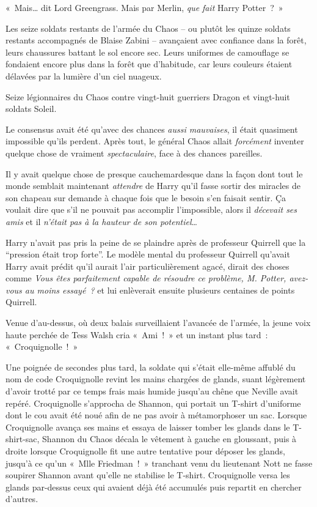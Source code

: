 «~Mais… dit Lord Greengrass. Mais par Merlin, \emph{que} \emph{fait} Harry Potter~?~»

\later

Les seize soldats restants de l'armée du Chaos -- ou plutôt les quinze soldats restants accompagnés de Blaise Zabini -- avançaient avec confiance dans la forêt, leurs chaussures battant le sol encore sec. Leurs uniformes de camouflage se fondaient encore plus dans la forêt que d'habitude, car leurs couleurs étaient délavées par la lumière d'un ciel nuageux.

Seize légionnaires du Chaos contre vingt-huit guerriers Dragon et vingt-huit soldats Soleil.

Le consensus avait été qu'avec des chances \emph{aussi mauvaises}, il était quasiment impossible qu'ils perdent. Après tout, le général Chaos allait \emph{forcément} inventer quelque chose de vraiment \emph{spectaculaire}, face à des chances pareilles.

Il y avait quelque chose de presque cauchemardesque dans la façon dont tout le monde semblait maintenant \emph{attendre} de Harry qu'il fasse sortir des miracles de son chapeau sur demande à chaque fois que le besoin s'en faisait sentir. Ça voulait dire que s'il ne pouvait pas accomplir l'impossible, alors il \emph{décevait ses amis} et il \emph{n'était pas à la hauteur de son potentiel}…

Harry n'avait pas pris la peine de se plaindre après de professeur Quirrell que la “pression était trop forte”. Le modèle mental du professeur Quirrell qu'avait Harry avait prédit qu'il aurait l'air particulièrement agacé, dirait des choses comme \emph{Vous êtes parfaitement capable de résoudre ce problème, M. Potter, avez-vous au moins essayé~?} et lui enlèverait ensuite plusieurs centaines de points Quirrell.

Venue d'au-dessus, où deux balais surveillaient l'avancée de l'armée, la jeune voix haute perchée de Tess Walsh cria «~Ami~!~» et un instant plus tard~: «~Croquignolle~!~»

Une poignée de secondes plus tard, la soldate qui s'était elle-même affublé du nom de code Croquignolle revint les mains chargées de glands, suant légèrement d'avoir trotté par ce temps frais mais humide jusqu'au chêne que Neville avait repéré. Croquignolle s'approcha de Shannon, qui portait un T-shirt d'uniforme dont le cou avait été noué afin de ne pas avoir à métamorphoser un sac. Lorsque Croquignolle avança ses mains et essaya de laisser tomber les glands dans le T-shirt-sac, Shannon du Chaos décala le vêtement à gauche en gloussant, puis à droite lorsque Croquignolle fit une autre tentative pour déposer les glands, jusqu'à ce qu'un «~Mlle Friedman~!~» tranchant venu du lieutenant Nott ne fasse soupirer Shannon avant qu'elle ne stabilise le T-shirt. Croquignolle versa les glands par-dessus ceux qui avaient déjà été accumulés puis repartit en chercher d'autres.

